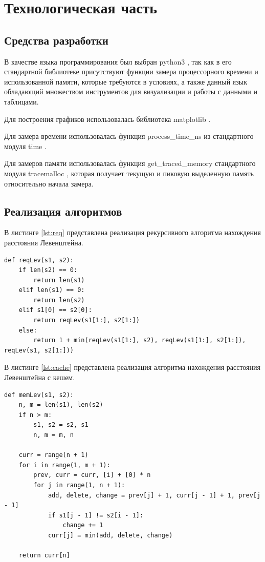 \chapter{Технологическая часть}

\section{Средства разработки}

В качестве языка программирования был выбран python3 \cite{python3}, так как в его стандартной библиотеке присутствуют функции замера процессорного времени и использованной памяти, которые требуются в условиях, а также данный язык обладающий множеством инструментов для визуализации и работы с данными и таблицами.

Для построения графиков использовалась библиотека matplotlib  \cite{python3-matplotlib}.

Для замера времени использовалась функция process\_time\_ns из стандартного модуля time \cite{python3-time}.

Для замеров памяти использовалась функция get\_traced\_memory стандартного модуля tracemalloc \cite{tracemalloc}, которая получает текущую и пиковую выделенную память относительно начала замера.

\section{Реализация алгоритмов}

В листинге \ref{lst:req} представлена реализация рекурсивного алгоритма нахождения расстояния Левенштейна.

\begin{lstlisting}[label=lst:req,caption={Рекурсивный алгоритм нахождения расстояния Левенштейна}]
def reqLev(s1, s2):
    if len(s2) == 0:
        return len(s1)
    elif len(s1) == 0:
        return len(s2)
    elif s1[0] == s2[0]:
        return reqLev(s1[1:], s2[1:])
    else:
        return 1 + min(reqLev(s1[1:], s2), reqLev(s1[1:], s2[1:]), reqLev(s1, s2[1:]))
\end{lstlisting}

\clearpage

В листинге \ref{lst:cache} представлена реализация алгоритма нахождения расстояния Левенштейна с кешем.

\begin{lstlisting}[label=lst:cache,caption={Алгоритм нахождения расстояния Левенштейна с кешэм}]
def memLev(s1, s2):
    n, m = len(s1), len(s2)
    if n > m:
        s1, s2 = s2, s1
        n, m = m, n

    curr = range(n + 1)
    for i in range(1, m + 1):
        prev, curr = curr, [i] + [0] * n
        for j in range(1, n + 1):
            add, delete, change = prev[j] + 1, curr[j - 1] + 1, prev[j - 1]
            if s1[j - 1] != s2[i - 1]:
                change += 1
            curr[j] = min(add, delete, change)
    
    return curr[n]
\end{lstlisting}


